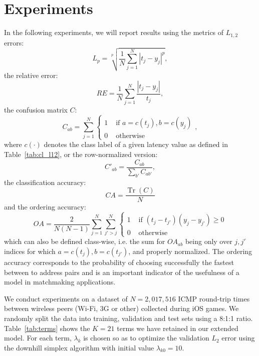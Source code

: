 \documentclass[10pt,a4paper,notitlepage,twocolumn]{article}
\begin{document}
\section{Experiments}

In the following experiments, we will report results using the metrics of $L_{1,2}$ errors:
\begin{equation}
L_p = \sqrt[p]{\frac1N\sum_{j=1}^N |t_j-y_j|^p},
\end{equation}
%
the relative error:
\begin{equation}
RE = \frac1N\sum_{j=1}^N \frac{|t_j-y_j|}{t_j},
\end{equation}
%
the confusion matrix $C$:
\begin{equation}
C_{ab} = \sum_{j=1}^N
\begin{cases}
1 & \text{ if } a=c(t_j),b=c(y_j) \\ 
0 & \text{ otherwise}
\end{cases},
\end{equation}
where $c(\cdot)$ denotes the class label of a given latency value as defined in Table~\ref{tab:cl_l12},
or the row-normalized version:
\begin{equation}
C'_{ab} = \frac{C_{ab}}{\sum_{b'} C_{ab'}},
\end{equation}
%
the classification accuracy:
\begin{equation}
CA = \frac{\operatorname{Tr}(C)}N
\end{equation}
%
and the ordering accuracy:
\begin{equation}
OA = \frac2{N(N-1)}\sum_{j=1}^N\sum_{j'>j}^N
\begin{cases}
1 & \text{ if } (t_j-t_{j'})(y_j-y_{j'})\ge0 \\ 
0 & \text{ otherwise}
\end{cases}
\end{equation}
which can also be defined class-wise, i.e. the sum for $OA_{ab}$ being only over $j,j'$ indices for which $a=c(t_j),b=c(t_{j'})$, and properly normalized.
The ordering accuracy corresponds to the probability of choosing successfully the fastest between to address pairs and is an important indicator of the usefulness of a model in matchmaking applications.


We conduct experiments on a dataset of $N=2,017,516$ ICMP round-trip times between wireless peers (Wi-Fi, 3G or other) collected during iOS games.
We randomly split the data into training, validation and test sets using a 8:1:1 ratio.
Table~\ref{tab:terms} shows the $K=21$ terms we have retained in our extended model.
For each term, $\lambda_k$ is chosen so as to optimize the validation $L_2$ error using the downhill simplex algorithm with initial value $\lambda_{k0}=10$.
\end{document}
